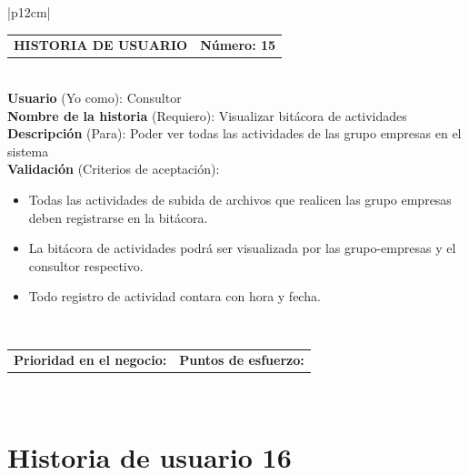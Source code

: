 \documentclass[11pt,letterpaper]{report}
\begin{document}
	\begin{center}	
		\begin{tabular}{|p{12cm}|}
			\hline
			\begin{tabular}{c|c}
				\textbf{HISTORIA DE USUARIO} & \textbf{Número: 15} \\
			\end{tabular} \\ \hline
			\textbf{Usuario} (Yo como): Consultor \\ \hline
			\textbf{Nombre de la historia} (Requiero): Visualizar bitácora de actividades\\ \hline
			\textbf{Descripción} (Para): Poder ver todas las actividades de las grupo empresas en el sistema \\ \hline
			\textbf{Validación} (Criterios de aceptación): \\
			\begin{minipage}{12cm}
				\begin{itemize}
					\item Todas las actividades de subida de archivos que realicen las grupo empresas deben registrarse en la bitácora.
					\item La bitácora de actividades podrá ser visualizada por las grupo-empresas y el consultor respectivo.
					\item Todo registro de actividad contara con hora y fecha.
				\end{itemize}
			\end{minipage} \\ \hline
			\begin{tabular}{c|c}
				\textbf{Prioridad en el negocio: } & \textbf{Puntos de esfuerzo: } \\
			\end{tabular} \\ \hline
		\end{tabular}
	\end{center}
	
	\section{Historia de usuario 16}
	
\end{document}
